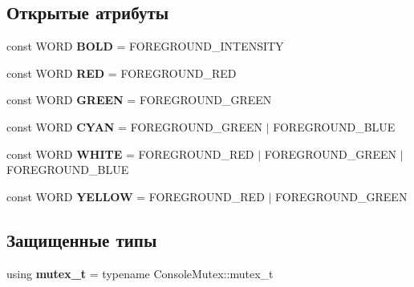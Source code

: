 \subsection*{Открытые атрибуты}
\begin{DoxyCompactItemize}
\item 
\mbox{\label{classspdlog_1_1sinks_1_1wincolor__sink_ab9370343b897d066d00735e401902c81}} 
const W\+O\+RD {\bfseries B\+O\+LD} = F\+O\+R\+E\+G\+R\+O\+U\+N\+D\+\_\+\+I\+N\+T\+E\+N\+S\+I\+TY
\item 
\mbox{\label{classspdlog_1_1sinks_1_1wincolor__sink_a7770e750368d34abe2c013ae218a064f}} 
const W\+O\+RD {\bfseries R\+ED} = F\+O\+R\+E\+G\+R\+O\+U\+N\+D\+\_\+\+R\+ED
\item 
\mbox{\label{classspdlog_1_1sinks_1_1wincolor__sink_ae51b24782629cea19369148d202e83d4}} 
const W\+O\+RD {\bfseries G\+R\+E\+EN} = F\+O\+R\+E\+G\+R\+O\+U\+N\+D\+\_\+\+G\+R\+E\+EN
\item 
\mbox{\label{classspdlog_1_1sinks_1_1wincolor__sink_a612bbcf26e98ba6db74634c60aaf7292}} 
const W\+O\+RD {\bfseries C\+Y\+AN} = F\+O\+R\+E\+G\+R\+O\+U\+N\+D\+\_\+\+G\+R\+E\+EN $\vert$ F\+O\+R\+E\+G\+R\+O\+U\+N\+D\+\_\+\+B\+L\+UE
\item 
\mbox{\label{classspdlog_1_1sinks_1_1wincolor__sink_a01318a5e5bcdf7816233483790c8f061}} 
const W\+O\+RD {\bfseries W\+H\+I\+TE} = F\+O\+R\+E\+G\+R\+O\+U\+N\+D\+\_\+\+R\+ED $\vert$ F\+O\+R\+E\+G\+R\+O\+U\+N\+D\+\_\+\+G\+R\+E\+EN $\vert$ F\+O\+R\+E\+G\+R\+O\+U\+N\+D\+\_\+\+B\+L\+UE
\item 
\mbox{\label{classspdlog_1_1sinks_1_1wincolor__sink_aab067632dff117a9ef5e2898cf3f743b}} 
const W\+O\+RD {\bfseries Y\+E\+L\+L\+OW} = F\+O\+R\+E\+G\+R\+O\+U\+N\+D\+\_\+\+R\+ED $\vert$ F\+O\+R\+E\+G\+R\+O\+U\+N\+D\+\_\+\+G\+R\+E\+EN
\end{DoxyCompactItemize}
\subsection*{Защищенные типы}
\begin{DoxyCompactItemize}
\item 
\mbox{\label{classspdlog_1_1sinks_1_1wincolor__sink_ae79569edf4d5eeaf89ef6dbd15d2192d}} 
using {\bfseries mutex\+\_\+t} = typename Console\+Mutex\+::mutex\+\_\+t
\end{DoxyCompactItemize}
